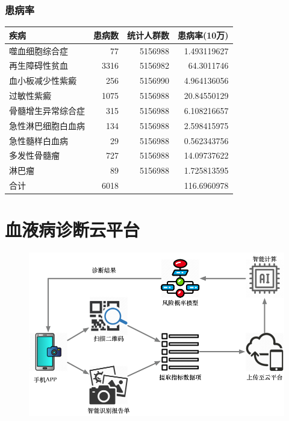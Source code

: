 \documentclass[UTF8,aspectratio=1610,10pt]{ctexbeamer}
\begin{document}
\begin{frame}
\frametitle{患病率}
\begin{table}
	\centering

\begin{tabular}{l|rr|r}

疾病	& 患病数	& 统计人群数	& 患病率(10万)\\

\hline
噬血细胞综合症	& 77	& 5156988	& 1.493119627\\

再生障碍性贫血	& 3316	& 5156982	& 64.3011746\\

血小板减少性紫癜	& 256	& 5156990	& 4.964136056\\

过敏性紫癜	& 1075	& 5156988	& 20.84550129\\

骨髓增生异常综合症	& 315	& 5156988	& 6.108216657\\

急性淋巴细胞白血病	& 134	& 5156988	& 2.598415975\\

急性髓样白血病	& 29	& 5156988	& 0.562343756\\

多发性骨髓瘤	& 727	& 5156988	& 14.09737622\\

淋巴瘤	& 89	& 5156988	& 1.725813595\\
\hline
合计	& 6018	&	& 116.6960978\\

\end{tabular}
\end{table}
\end{frame}

\section{血液病诊断云平台}

\begin{frame}
\begin{figure}
	\centering
	\includegraphics[width=.9\textwidth]{images/prototype.png}
\end{figure}
\end{frame}
\end{document}
